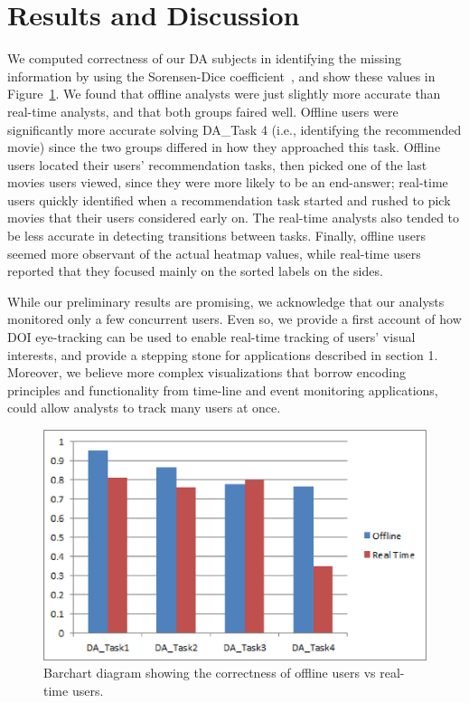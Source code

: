﻿\section{Results and Discussion}
We computed correctness of our DA subjects in identifying the missing information by using the Sorensen-Dice coefficient~\cite{sorensen1948method}, and show these values in Figure~\ref{fig:barchart}. We found that offline analysts were just slightly more accurate than real-time analysts, and that both groups faired well. Offline users were significantly more accurate solving DA\_Task 4 (i.e., identifying the recommended movie) since the two groups differed in how they approached this task. Offline users located their users' recommendation tasks, then picked one of the last movies users viewed, since they were more likely to be an end-answer; real-time users quickly identified when a recommendation task started and rushed to pick movies that their users considered early on. The real-time analysts also tended to be less accurate in detecting transitions between tasks. Finally, offline users seemed more observant of the actual heatmap values, while real-time users reported that they focused mainly on the sorted labels on the sides. 

While our preliminary results are promising, we acknowledge that our analysts monitored only a few concurrent users. Even so, we provide a first account of how DOI eye-tracking can be used to enable real-time tracking of users' visual interests, and provide a stepping stone for applications described in section 1.  Moreover, we believe more complex visualizations that borrow encoding principles and functionality from time-line and event monitoring applications, could allow analysts to track many users at once.   



\begin{figure}[htb]
  \centering
  \includegraphics[width=0.9\linewidth]{images/barchart.eps}
  \caption{Barchart diagram showing the correctness of offline users vs real-time users.}
	\label{fig:barchart}
\end{figure} 

